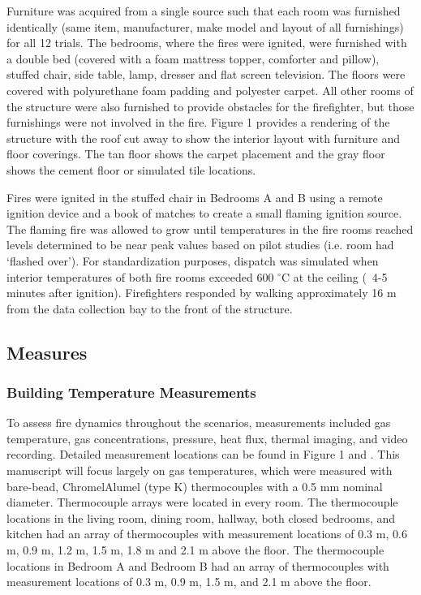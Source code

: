 \documentclass[12pt,oneside]{article}
\begin{document}
Furniture was acquired from a single source such that each room was furnished identically (same item, manufacturer, make model and layout of all furnishings) for all 12 trials. The bedrooms, where the fires were ignited, were furnished with a double bed (covered with a foam mattress topper, comforter and pillow), stuffed chair, side table, lamp, dresser and flat screen television.  The floors were covered with polyurethane foam padding and polyester carpet.  All other rooms of the structure were also furnished to provide obstacles for the firefighter, but those furnishings were not involved in the fire. Figure 1 provides a rendering of the structure with the roof cut away to show the interior layout with furniture and floor coverings.  The tan floor shows the carpet placement and the gray floor shows the cement floor or simulated tile locations.  

Fires were ignited in the stuffed chair in Bedrooms  A and B using a remote ignition device and a book of matches to create a small flaming ignition source.  The flaming fire was allowed to grow until temperatures in the fire rooms reached levels determined to be near peak values based on pilot studies (i.e. room had `flashed over').  For standardization purposes, dispatch was simulated when interior temperatures of both fire rooms exceeded 600 $^{\circ}$C at the ceiling (~4-5 minutes after ignition). Firefighters responded by walking approximately 16 m from the data collection bay to the front of the structure.  

\subsection{Measures}

\subsubsection{Building Temperature Measurements}
To assess fire dynamics throughout the  scenarios, measurements included gas temperature, gas concentrations, pressure, heat flux, thermal imaging, and video recording. Detailed measurement locations can be found in Figure 1 and \cite{Horn:2016}. This manuscript will focus largely on gas temperatures, which were measured with bare-bead, ChromelAlumel (type K) thermocouples with a 0.5 mm nominal diameter. Thermocouple arrays were located in every room. The thermocouple locations in the living room, dining room, hallway, both closed bedrooms, and kitchen had an array of thermocouples with measurement locations of 0.3 m, 0.6 m, 0.9 m, 1.2 m, 1.5 m, 1.8 m and 2.1 m above the floor. The thermocouple locations in Bedroom A and Bedroom B had an array of thermocouples with measurement locations of 0.3 m, 0.9 m, 1.5 m, and 2.1 m above the floor. 
\end{document}
